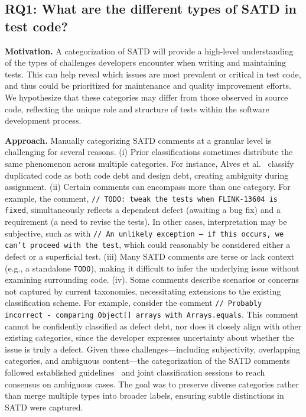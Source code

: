 \subsection{RQ1: What are the different types of SATD in test code?}
\textbf{Motivation.} A categorization of SATD will provide a high-level understanding of the types of challenges developers encounter when writing and maintaining tests. This can help reveal which issues are most prevalent or critical in test code, and thus could be prioritized for maintenance and quality improvement efforts. We hypothesize that these categories may differ from those observed in source code, reflecting the unique role and structure of tests within the software development process.

\textbf{Approach.} Manually categorizing SATD comments at a granular level is challenging for several reasons.
(i) Prior classifications sometimes distribute the same phenomenon across multiple categories. For instance, Alves et al.~\cite{alves_towards_2014} classify duplicated code as both code debt and design debt, creating ambiguity during assignment.
(ii) Certain comments can encompass more than one category. For example, the comment, \texttt{// TODO: tweak the tests when FLINK-13604 is fixed}, simultaneously reflects a dependent defect (awaiting a bug fix) and a requirement (a need to revise the tests). In other cases, interpretation may be subjective, such as with \texttt{// An unlikely exception — if this occurs, we can't proceed with the test}, which could reasonably be considered either a defect or a superficial test.
(iii) Many SATD comments are terse or lack context (e.g., a standalone \texttt{TODO}), making it difficult to infer the underlying issue without examining surrounding code.
(iv). Some comments describe scenarios or concerns not captured by current taxonomies, necessitating extensions to the existing classification scheme. For example, consider the comment \texttt{// Probably incorrect - comparing Object[] arrays with Arrays.equals}. This comment cannot be confidently classified as defect debt, nor does it closely align with other existing categories, since the developer expresses uncertainty about whether the issue is truly a defect. Given these challenges—including subjectivity, overlapping categories, and ambiguous content—the categorization of the \totalSatdCount{} SATD comments followed established guidelines~\cite{alves_towards_2014,bavota_large-scale_2016} and joint classification sessions to reach consensus on ambiguous cases. The goal was to preserve diverse categories rather than merge multiple types into broader labels, ensuring subtle distinctions in SATD were captured.

